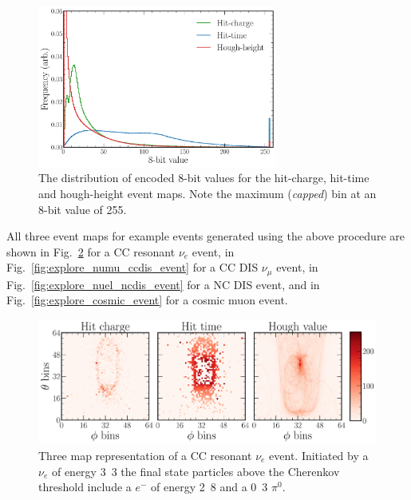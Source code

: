 \begin{figure} %
    \includegraphics[width=0.7\textwidth]{diagrams/6-cvn/chipsnet/explore_8_bit_range.pdf}
    \caption[Event map encoded 8-bit distributions.]
    {The distribution of encoded 8-bit values for the hit-charge, hit-time and hough-height event
        maps. Note the maximum (\emph{capped}) bin at an 8-bit value of 255.}
    \label{fig:explore_8_bit_range}
\end{figure}

All three event maps for example events generated using the above procedure are shown in
Fig.~\ref{fig:explore_nuel_ccres_event} for a CC resonant $\nu_{e}$ event, in
Fig.~\ref{fig:explore_numu_ccdis_event} for a CC DIS $\nu_{\mu}$ event, in
Fig.~\ref{fig:explore_nuel_ncdis_event} for a NC DIS event, and in
Fig.~\ref{fig:explore_cosmic_event} for a cosmic muon event.

\begin{figure} %
    \includegraphics[width=\textwidth]{diagrams/6-cvn/chipsnet/explore_nuel_ccres_event.pdf}
    \caption[Example of a CC resonant $\nu_{e}$ event.]
    {Three map representation of a CC resonant $\nu_{e}$ event. Initiated by a $\nu_{e}$ of
        energy \unit{3.3}{\GeV} the final state particles above the Cherenkov threshold include a
        $e^{-}$ of energy \unit{2.8}{\GeV} and a \unit{0.3}{\GeV} $\pi^{0}$.}
    \label{fig:explore_nuel_ccres_event}
\end{figure}

